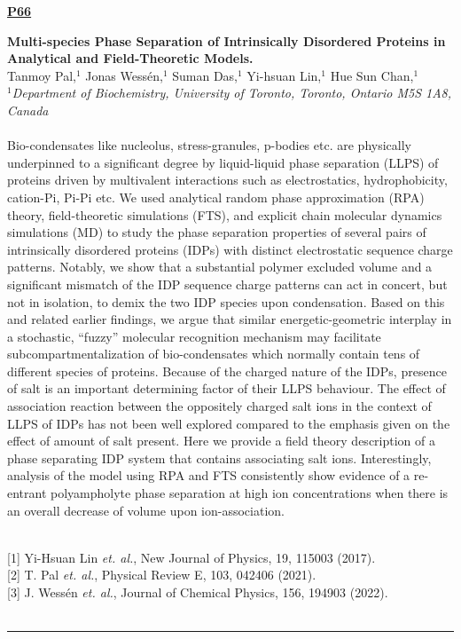 \documentclass[titlepage,oneside,openany,10pt]{book}
\newenvironment{posterabswref}[5] %
        {
        \newcommand{\posterref}{#5}
	\begin{flushright}
                \underline{\textbf{#4}}
        \end{flushright}
        \textbf{#1}\\%
        #2\\%
        \textit{#3}\\\\%
        }
        {
        \vspace{0.5cm}
        \\\noindent \posterref \\ \noindent\rule{15cm}{0.5pt}%
        }
\begin{document}
\begin{posterabswref}
	{Multi-species Phase Separation of Intrinsically Disordered Proteins in Analytical and Field-Theoretic Models.}
	{Tanmoy Pal,$^{1}$ Jonas Wess\'{e}n,$^{1}$ Suman Das,$^{1}$ Yi-hsuan Lin,$^{1}$ Hue Sun Chan,$^{1}$}
	{
	$^1$Department of Biochemistry, University of Toronto, Toronto, Ontario M5S 1A8, Canada
	}
	{P66}
	{
	{[1]} Yi-Hsuan Lin \emph{et. al.}, New Journal of Physics, 19, 115003 (2017).\\
	{[2]} T. Pal \emph{et. al.}, Physical Review E, 103, 042406 (2021).\\
	{[3]} J. Wess\'{e}n \emph{et. al.}, Journal of Chemical Physics, 156, 194903 (2022).\\
	}
	Bio-condensates like nucleolus, stress-granules, p-bodies etc. are physically underpinned to a significant degree by liquid-liquid phase separation (LLPS) of proteins driven by multivalent interactions such as electrostatics, hydrophobicity, cation-Pi, Pi-Pi etc. We used analytical random phase approximation (RPA) theory, field-theoretic simulations (FTS), and explicit chain molecular dynamics simulations (MD) to study the phase separation properties of several pairs of intrinsically disordered proteins (IDPs) with distinct electrostatic sequence charge patterns. Notably, we show that a substantial polymer excluded volume and a significant mismatch of the IDP sequence charge patterns can act in concert, but not in isolation, to demix the two IDP species upon condensation. Based on this and related earlier findings, we argue that similar energetic-geometric interplay in a stochastic, ``fuzzy'' molecular recognition mechanism may facilitate subcompartmentalization of bio-condensates which normally contain tens of different species of proteins. Because of the charged nature of the IDPs, presence of salt is an important determining factor of their LLPS behaviour. The effect of association reaction between the oppositely charged salt ions in the context of LLPS of IDPs has not been well explored compared to the emphasis given on the effect of amount of salt present. Here we provide a field theory description of a phase separating IDP system that contains associating salt ions. Interestingly, analysis of the model using RPA and FTS consistently show evidence of a re-entrant polyampholyte phase separation at high ion concentrations when there is an overall decrease of volume upon ion-association.
	\label{PalT}
\end{posterabswref}
\end{document}

